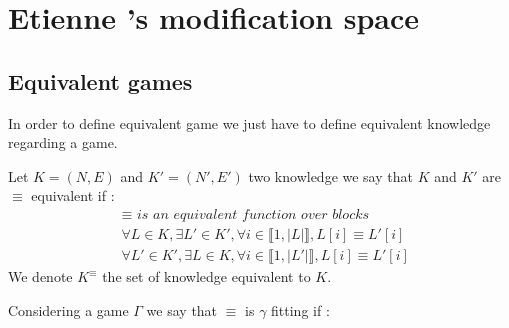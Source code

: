 \section{Etienne 's modification space}




\subsection{Equivalent games}

In order to define equivalent game we just have to define equivalent knowledge regarding a game.

\begin{mydef}
	Let $K = (N,E)$ and $K'=(N',E')$ two knowledge we say that $K$ and $K'$ are $\equiv$ equivalent if :
	\begin{eqnarray*}
		& \equiv \textit{ is an equivalent function over blocks}  \\
		& \forall L \in K, \exists L' \in K', \forall i \in \llbracket 1,|L| \rrbracket, L[i] \equiv L'[i] \\
		& \forall L' \in K', \exists L \in K, \forall i \in \llbracket 1,|L'| \rrbracket, L[i] \equiv L'[i] 
	\end{eqnarray*}	
	We denote $K^{\equiv}$ the set of knowledge equivalent to $K$. 
\end{mydef}

\begin{mydef}
	Considering a game $\Gamma$ we say that $\equiv$ is $\gamma$ fitting if :
\end{mydef}
